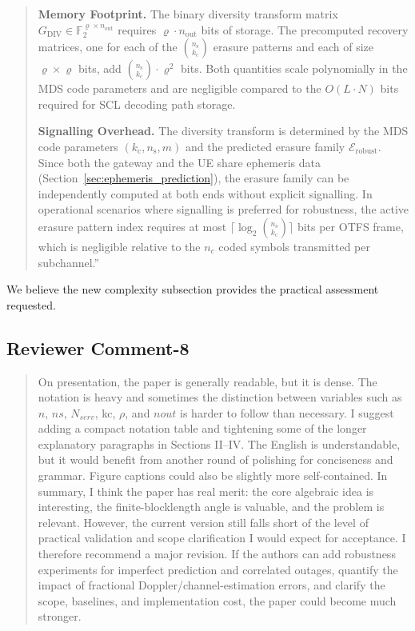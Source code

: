\begin{quote}
{\color{blue}\textbf{Memory Footprint.}
The binary diversity transform matrix
$G_{\mathrm{DIV}} \in \mathbb{F}_2^{\varrho \times n_{\mathrm{out}}}$
requires $\varrho \cdot n_{\mathrm{out}}$ bits of storage.
The precomputed recovery matrices, one for each of the
$\binom{n_{\mathrm{s}}}{k_{\mathrm{c}}}$ erasure patterns and
each of size $\varrho \times \varrho$ bits, add
$\binom{n_{\mathrm{s}}}{k_{\mathrm{c}}} \cdot \varrho^2$ bits.
Both quantities scale polynomially in the MDS code parameters and
are negligible compared to the $O(L \cdot N)$ bits required for
SCL decoding path storage.}

{\color{blue}\textbf{Signalling Overhead.}
The diversity transform is determined by the MDS code parameters
$(k_{\mathrm{c}}, n_{\mathrm{s}}, m)$ and the predicted erasure
family $\mathcal{E}_{\mathrm{robust}}$. Since both the gateway
and the UE share ephemeris data
(Section~\ref{sec:ephemeris_prediction}), the erasure family can
be independently computed at both ends without explicit signalling.
In operational scenarios where signalling is preferred for
robustness, the active erasure pattern index requires at most
$\lceil\log_2\binom{n_{\mathrm{s}}}{k_{\mathrm{c}}}\rceil$ bits
per OTFS frame, which is negligible relative to the $n_c$ coded
symbols transmitted per subchannel.}''
\end{quote}

We believe the new complexity subsection provides the practical assessment requested.


\subsection{Reviewer Comment-8}



\begin{mdframed}
\begin{quote}
On presentation, the paper is generally readable, but it is dense. The notation is heavy and sometimes the distinction between variables such as $n$, $ns$, $N_{serv}$, kc, $\rho$, and $nout$ is harder to follow than necessary. I suggest adding a compact notation table and tightening some of the longer explanatory paragraphs in Sections II–IV. The English is understandable, but it would benefit from another round of polishing for conciseness and grammar. Figure captions could also be slightly more self-contained.
In summary, I think the paper has real merit: the core algebraic idea is interesting, the finite-blocklength angle is valuable, and the problem is relevant. However, the current version still falls short of the level of practical validation and scope clarification I would expect for acceptance. I therefore recommend a major revision. If the authors can add robustness experiments for imperfect prediction and correlated outages, quantify the impact of fractional Doppler/channel-estimation errors, and clarify the scope, baselines, and implementation cost, the paper could become much stronger.
\end{quote}

\end{mdframed}


